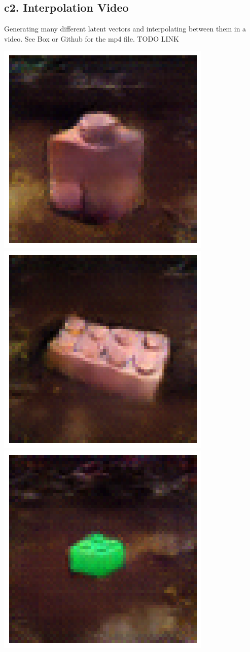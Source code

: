 \documentclass{article}
\begin{document}
\subsection*{c2. Interpolation Video}
Generating many different latent vectors and interpolating between them in a video. See Box or Github for the mp4 file.
TODO LINK
\begin{center}
\includegraphics[scale=0.25]{./imgs/f1}
\includegraphics[scale=0.25]{./imgs/f2}
\includegraphics[scale=0.25]{./imgs/f3}

\end{center}
\end{document}

